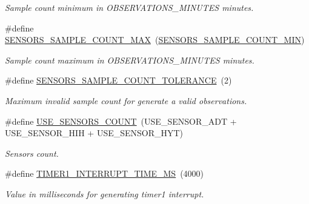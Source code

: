 \begin{DoxyCompactItemize}
\begin{DoxyCompactList}\small\item\em Sample count minimum in O\+B\+S\+E\+R\+V\+A\+T\+I\+O\+N\+S\+\_\+\+M\+I\+N\+U\+T\+ES minutes. \end{DoxyCompactList}\item 
\mbox{\label{i2c-th-config_8h_a5500c7c28f9fc2cab4deffbe07c98b39}} 
\#define \hyperlink{i2c-th-config_8h_a5500c7c28f9fc2cab4deffbe07c98b39}{S\+E\+N\+S\+O\+R\+S\+\_\+\+S\+A\+M\+P\+L\+E\+\_\+\+C\+O\+U\+N\+T\+\_\+\+M\+AX}~(\hyperlink{i2c-th-config_8h_a05567a696548b4a2e03c49dc893a32c8}{S\+E\+N\+S\+O\+R\+S\+\_\+\+S\+A\+M\+P\+L\+E\+\_\+\+C\+O\+U\+N\+T\+\_\+\+M\+IN})
\begin{DoxyCompactList}\small\item\em Sample count maximum in O\+B\+S\+E\+R\+V\+A\+T\+I\+O\+N\+S\+\_\+\+M\+I\+N\+U\+T\+ES minutes. \end{DoxyCompactList}\item 
\mbox{\label{i2c-th-config_8h_a4ee69ccbdc607eb03834e7cf1d950ec0}} 
\#define \hyperlink{i2c-th-config_8h_a4ee69ccbdc607eb03834e7cf1d950ec0}{S\+E\+N\+S\+O\+R\+S\+\_\+\+S\+A\+M\+P\+L\+E\+\_\+\+C\+O\+U\+N\+T\+\_\+\+T\+O\+L\+E\+R\+A\+N\+CE}~(2)
\begin{DoxyCompactList}\small\item\em Maximum invalid sample count for generate a valid observations. \end{DoxyCompactList}\item 
\mbox{\label{i2c-th-config_8h_af18dc3de744722cb308451b7a705611b}} 
\#define \hyperlink{i2c-th-config_8h_af18dc3de744722cb308451b7a705611b}{U\+S\+E\+\_\+\+S\+E\+N\+S\+O\+R\+S\+\_\+\+C\+O\+U\+NT}~(U\+S\+E\+\_\+\+S\+E\+N\+S\+O\+R\+\_\+\+A\+DT + U\+S\+E\+\_\+\+S\+E\+N\+S\+O\+R\+\_\+\+H\+IH + U\+S\+E\+\_\+\+S\+E\+N\+S\+O\+R\+\_\+\+H\+YT)
\begin{DoxyCompactList}\small\item\em Sensors count. \end{DoxyCompactList}\item 
\mbox{\label{i2c-th-config_8h_a42354f9347cc2a67e00dd79c5da40833}} 
\#define \hyperlink{i2c-th-config_8h_a42354f9347cc2a67e00dd79c5da40833}{T\+I\+M\+E\+R1\+\_\+\+I\+N\+T\+E\+R\+R\+U\+P\+T\+\_\+\+T\+I\+M\+E\+\_\+\+MS}~(4000)
\begin{DoxyCompactList}\small\item\em Value in milliseconds for generating timer1 interrupt. \end{DoxyCompactList}\item 

\end{DoxyCompactItemize}
